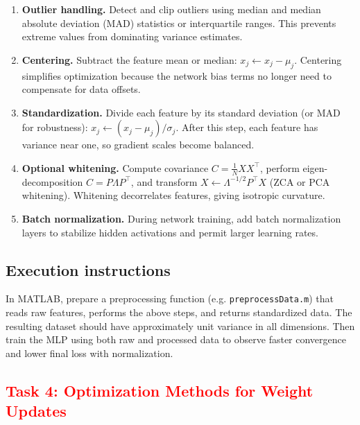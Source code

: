 \documentclass[11pt,a4paper]{article}
\begin{document}
\begin{enumerate}
  \item \textbf{Outlier handling.}
        Detect and clip outliers using median and median absolute deviation (MAD)
        statistics or interquartile ranges.
        This prevents extreme values from dominating variance estimates.

  \item \textbf{Centering.}
        Subtract the feature mean or median:
        $x_j \leftarrow x_j - \mu_j$.
        Centering simplifies optimization because the network bias terms
        no longer need to compensate for data offsets.

  \item \textbf{Standardization.}
        Divide each feature by its standard deviation (or MAD for robustness):
        $x_j \leftarrow (x_j - \mu_j) / \sigma_j$.
        After this step, each feature has variance near one, so gradient scales
        become balanced.

  \item \textbf{Optional whitening.}
        Compute covariance $C = \frac{1}{N} X X^{\top}$,
        perform eigen-decomposition $C = P \Lambda P^{\top}$,
        and transform $X \leftarrow \Lambda^{-1/2} P^{\top} X$ (ZCA or PCA whitening).
        Whitening decorrelates features, giving isotropic curvature.

  \item \textbf{Batch normalization.}
        During network training, add batch normalization layers to stabilize
        hidden activations and permit larger learning rates.
\end{enumerate}

\subsection*{Execution instructions}
In MATLAB, prepare a preprocessing function (e.g. \texttt{preprocessData.m})
that reads raw features, performs the above steps, and returns standardized data.
The resulting dataset should have approximately unit variance in all dimensions.
Then train the MLP using both raw and processed data to observe faster convergence
and lower final loss with normalization.

\subsection{\textcolor{red}{Task 4: Optimization Methods for Weight Updates}}
\end{document}
